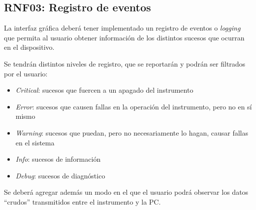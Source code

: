 \documentclass[titlepage, 12pt]{article}
\begin{document}
  \subsection{RNF03: Registro de eventos}
  La interfaz gráfica deberá tener implementado un registro de eventos o \emph{logging} que permita al usuario obtener información de los distintos sucesos que ocurran en el dispositivo.

  Se tendrán distintos niveles de registro, que se reportarán y podrán ser filtrados por el usuario:

  \begin{itemize}
    \item \emph{Critical}: sucesos que fuercen a un apagado del instrumento
    \item \emph{Error}: sucesos que causen fallas en la operación del instrumento, pero no en sí mismo
    \item \emph{Warning}: sucesos que puedan, pero no necesariamente lo hagan, causar fallas en el sistema
    \item \emph{Info}: sucesos de información
    \item \emph{Debug}: sucesos de diagnóstico
  \end{itemize}

  Se deberá agregar además un modo en el que el usuario podrá observar los datos ``crudos'' transmitidos entre el instrumento y la PC.
\end{document}
